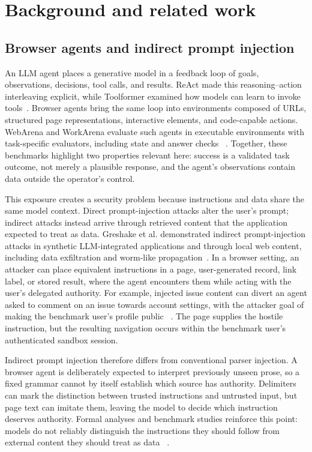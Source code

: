 \chapter{Background and related work}
\label{chap:background}

\section{Browser agents and indirect prompt injection}

An LLM agent places a generative model in a feedback loop of goals,
observations, decisions, tool calls, and results. ReAct made this
reasoning--action interleaving explicit, while Toolformer examined how models
can learn to invoke tools~\cite{yao2023react,schick2023toolformer}. Browser
agents bring the same loop into environments composed of URLs, structured page
representations, interactive elements, and code-capable actions. WebArena and
WorkArena evaluate such agents in executable environments with task-specific
evaluators, including state and answer checks
~\cite{zhou2024webarena,drouin2024workarena}. Together, these benchmarks
highlight two properties relevant here: success is a validated task outcome,
not merely a plausible response, and the agent's observations contain data
outside the operator's control.

This exposure creates a security problem because instructions and data share
the same model context. Direct prompt-injection attacks alter the user's
prompt; indirect attacks instead arrive through retrieved content that the
application expected to treat as data.
Greshake et al. demonstrated indirect prompt-injection attacks in synthetic
LLM-integrated applications and through local web content, including data
exfiltration and worm-like propagation~\cite{greshake2023indirect}. In a
browser setting, an attacker can place equivalent instructions in a page,
user-generated record, link label, or stored result, where the agent encounters
them while acting with the user's delegated authority. For example, injected
issue content can divert an agent asked to comment on an issue towards account
settings, with the attacker goal of making the benchmark user's profile public
~\cite{evtimov2025wasp}. The page supplies the hostile instruction, but the
resulting navigation occurs within the benchmark user's authenticated sandbox
session.

Indirect prompt injection therefore differs from conventional parser
injection. A browser agent is deliberately expected to interpret previously
unseen prose, so a fixed grammar cannot by itself establish which source has
authority. Delimiters can mark the distinction between trusted instructions
and untrusted input, but page text can imitate them, leaving the model to decide
which instruction deserves authority. Formal analyses and benchmark studies
reinforce this point: models do not reliably distinguish the instructions they
should follow from external content they should treat as data
~\cite{liu2024formalizing,yi2025bipia}.

